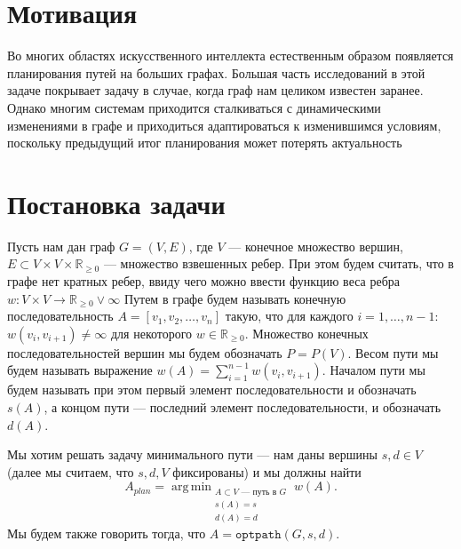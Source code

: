 \documentclass[11pt]{article}
\newcommand{\realpositive}{\mathbb{R}_{\geqslant 0}}
\DeclareMathOperator*{\argmin}{arg\,min}
\begin{document}
    \section{Мотивация}
    Во многих областях искусственного интеллекта естественным образом появляется планирования путей на больших графах.
    Большая часть исследований в этой задаче покрывает задачу в случае, когда граф нам целиком известен заранее.
    Однако многим системам приходится сталкиваться с динамическими изменениями в графе и приходиться адаптироваться к изменившимся условиям, поскольку предыдущий итог планирования может потерять актуальность


    \section{Постановка задачи}
    Пусть нам дан граф $G = (V, E)$, где $V$ --- конечное множество вершин, $E \subset V \times V \times \realpositive$ --- множество взвешенных ребер.
    При этом будем считать, что в графе нет кратных ребер, ввиду чего можно ввести функцию веса ребра $w: V \times V \rightarrow {\realpositive \lor \infty}$
    Путем в графе будем называть конечную последовательность $A = [v_1, v_2, \dots, v_n]$ такую, что для каждого $i = 1, \dots, n-1$: $w(v_i, v_{i+1}) \neq \infty$ для некоторого $w \in \mathbb{R}_{\geqslant 0}$.
    Множество конечных последовательностей вершин мы будем обозначать $P = P(V)$.
    Весом пути мы будем называть выражение $w(A) = \sum_{i = 1}^{n-1} w(v_i, v_{i+1})$.
    Началом пути мы будем называть при этом первый элемент последовательности и обозначать $s(A)$, а концом пути --- последний элемент последовательности, и обозначать $d(A)$.

    Мы хотим решать задачу минимального пути --- нам даны вершины $s, d \in V$  (далее мы считаем, что $s, d, V$ фиксированы) и мы должны найти
    $$A_{plan}= \argmin_{\substack{A \subset V \text{ --- путь в } G \\ s(A) = s \\ d(A) = d}} w(A).$$
    Мы будем также говорить тогда, что $A = \mathtt{optpath}(G, s, d)$.
\end{document}
